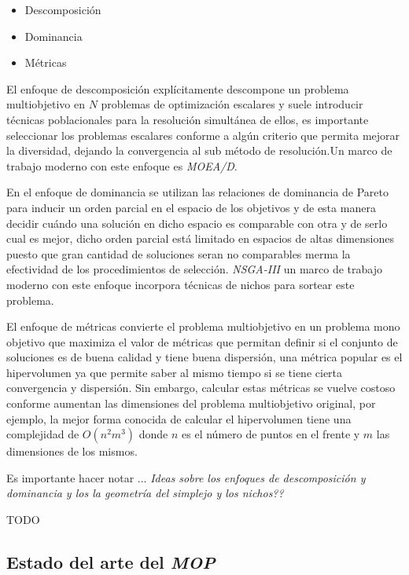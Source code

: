 \documentclass[letterpaper,10pt]{article}
\begin{document}
\begin{itemize}
 \item Descomposición
 \item Dominancia
 \item Métricas
\end{itemize}

El enfoque de descomposición explícitamente descompone un problema multiobjetivo en $N$ problemas de optimización escalares y suele introducir técnicas poblacionales para la resolución simultánea de ellos, es importante seleccionar los problemas escalares conforme a algún criterio que permita mejorar la diversidad, dejando la convergencia al sub método de resolución.Un marco de trabajo moderno con este enfoque es \emph{MOEA/D}.
\newline

En el enfoque de dominancia se utilizan las relaciones de dominancia de Pareto para inducir un orden parcial en el espacio de los objetivos y de esta manera decidir cuándo una solución en dicho espacio es comparable con otra y de serlo cual es mejor, dicho orden parcial está limitado en espacios de altas dimensiones puesto que gran cantidad de soluciones seran no comparables merma la efectividad de los procedimientos de selección. \emph{NSGA-III} un marco de trabajo moderno con este enfoque incorpora técnicas de nichos para sortear este problema.
\newline

El enfoque de métricas convierte el problema multiobjetivo en un problema mono objetivo que maximiza el valor de métricas que permitan definir si el conjunto de soluciones es de buena calidad y  tiene buena dispersión, una métrica popular es el hipervolumen ya que permite saber al mismo tiempo si se tiene cierta convergencia y dispersión. Sin embargo, calcular estas métricas se vuelve costoso conforme aumentan las dimensiones del problema multiobjetivo original, por ejemplo, la mejor forma conocida de calcular el hipervolumen tiene una complejidad de $O(n^2m^3)$ donde $n$ es el número de puntos en el frente y $m$ las dimensiones de los mismos.
\newline

Es importante hacer notar ... \emph{Ideas sobre los enfoques de descomposición y dominancia y los la geometría del  simplejo y los nichos??}
\newline

{\huge TODO}

\subsection{Estado del arte del \emph{MOP}}
\end{document}
